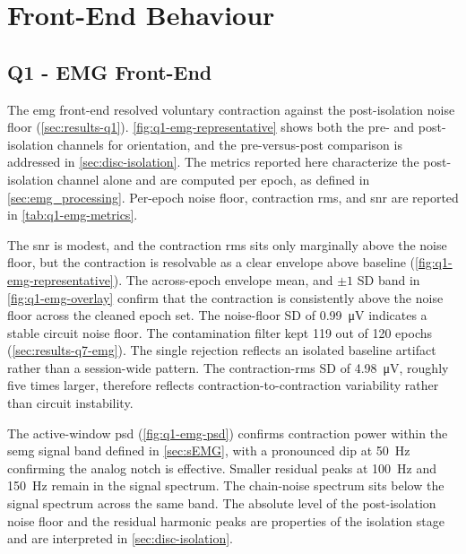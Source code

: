 \section{Front-End Behaviour}
\label{sec:disc-front-end}

\subsection{Q1 - EMG Front-End}
\label{sec:disc-q1}

The \gls{emg} front-end resolved voluntary contraction against the post-isolation noise floor (\autoref{sec:results-q1}). \autoref{fig:q1-emg-representative} shows both the pre- and post-isolation channels for orientation, and the pre-versus-post comparison is addressed in \autoref{sec:disc-isolation}. The metrics reported here characterize the post-isolation channel alone and are computed per epoch, as defined in \autoref{sec:emg_processing}. Per-epoch noise floor, contraction \gls{rms}, and \gls{snr} are reported in \autoref{tab:q1-emg-metrics}.


The \gls{snr} is modest, and the contraction \gls{rms} sits only marginally above the noise floor, but the contraction is resolvable as a clear envelope above baseline (\autoref{fig:q1-emg-representative}). The across-epoch envelope mean, and $\pm 1$ SD band in \autoref{fig:q1-emg-overlay} confirm that the contraction is consistently above the noise floor across the cleaned epoch set. The noise-floor SD of \SI{0.99}{\micro\volt} indicates a stable circuit noise floor. The contamination filter kept 119 out of 120 epochs (\autoref{sec:results-q7-emg}). The single rejection reflects an isolated baseline artifact rather than a session-wide pattern. The contraction-\gls{rms} SD of \SI{4.98}{\micro\volt}, roughly five times larger, therefore reflects contraction-to-contraction variability rather than circuit instability.

The active-window \gls{psd} (\autoref{fig:q1-emg-psd}) confirms contraction power within the \gls{semg} signal band defined in \autoref{sec:sEMG}, with a pronounced dip at \SI{50}{\hertz} confirming the analog notch is effective. Smaller residual peaks at \SI{100}{\hertz} and \SI{150}{\hertz} remain in the signal spectrum. The chain-noise spectrum sits below the signal spectrum across the same band. The absolute level of the post-isolation noise floor and the residual harmonic peaks are properties of the isolation stage and are interpreted in \autoref{sec:disc-isolation}.





